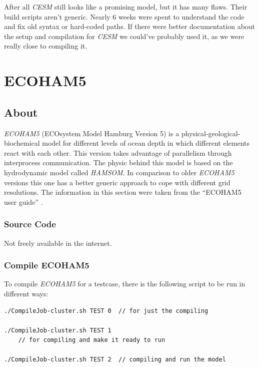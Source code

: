 \documentclass[]{article}
\begin{document}
After all \emph{CESM} still looks like a promising model, but it has
many flaws. Their build scripts aren't generic. Nearly 6 weeks were
spent to understand the code and fix old syntax or hard-coded paths. If
there were better documentation about the setup and compilation for
\emph{CESM} we could've probably used it, as we were really close to
compiling it.

\section{ECOHAM5}\label{ecoham5}

\subsection{About}\label{about}

\emph{ECOHAM5} (ECOsystem Model Hamburg Version 5) is a
physical-geological-biochemical model for different levels of ocean
depth in which different elements react with each other. This version
takes advantage of parallelism through interprocess communication. The
physic behind this model is based on the hydrodynamic model called
\emph{HAMSOM}. In comparison to older \emph{ECOHAM5} versions this one
has a better generic approach to cope with different grid resolutions.
The information in this section were taken from the ``ECOHAM5 user
guide'' \cite{ecoham5}.

\subsubsection{Source Code}\label{source-code}

Not freely available in the internet.

\subsubsection{Compile ECOHAM5}\label{compile-ecoham5}

To compile \emph{ECOHAM5} for a testcase, there is the following script
to be run in different ways:

\begin{verbatim}
./CompileJob-cluster.sh TEST 0  // for just the compiling

./CompileJob-cluster.sh TEST 1   
    // for compiling and make it ready to run

./CompileJob-cluster.sh TEST 2  // compiling and run the model
\end{verbatim}
\end{document}
